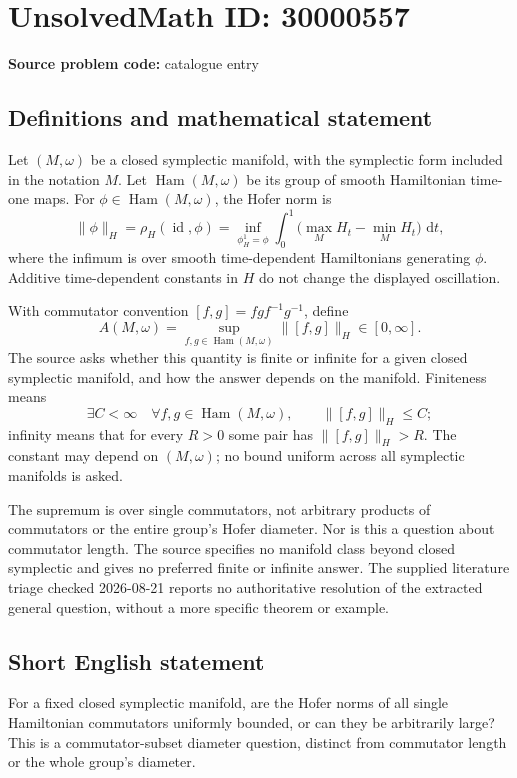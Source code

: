 \documentclass[11pt]{article}
\newcommand{\dd}{\,\mathrm{d}}
\begin{document}
\section*{UnsolvedMath ID: 30000557}
\textbf{Source problem code:} catalogue entry
\subsection{Definitions and mathematical statement}
Let \((M,\omega)\) be a closed symplectic manifold, with the symplectic form included in the notation \(M\). Let \(\operatorname{Ham}(M,\omega)\) be its group of smooth Hamiltonian time-one maps. For \(\phi\in\operatorname{Ham}(M,\omega)\), the Hofer norm is
\[
\|\phi\|_H=\rho_H(\operatorname{id},\phi)
=\inf_{\phi_H^1=\phi}\int_0^1
\bigl(\max_M H_t-\min_M H_t\bigr)\,\dd t,
\]
where the infimum is over smooth time-dependent Hamiltonians generating \(\phi\). Additive time-dependent constants in \(H\) do not change the displayed oscillation.

With commutator convention \([f,g]=fgf^{-1}g^{-1}\), define
\[
A(M,\omega)=\sup_{f,g\in\operatorname{Ham}(M,\omega)}\|[f,g]\|_H\in[0,\infty].
\]
The source asks whether this quantity is finite or infinite for a given closed symplectic manifold, and how the answer depends on the manifold. Finiteness means
\[
\exists C<\infty\quad\forall f,g\in\operatorname{Ham}(M,\omega),\qquad
\|[f,g]\|_H\leq C;
\]
infinity means that for every \(R>0\) some pair has \(\|[f,g]\|_H>R\). The constant may depend on \((M,\omega)\); no bound uniform across all symplectic manifolds is asked.

The supremum is over single commutators, not arbitrary products of commutators or the entire group's Hofer diameter. Nor is this a question about commutator length. The source specifies no manifold class beyond closed symplectic and gives no preferred finite or infinite answer. The supplied literature triage checked 2026-08-21 reports no authoritative resolution of the extracted general question, without a more specific theorem or example.
\subsection{Short English statement}
For a fixed closed symplectic manifold, are the Hofer norms of all single Hamiltonian commutators uniformly bounded, or can they be arbitrarily large? This is a commutator-subset diameter question, distinct from commutator length or the whole group's diameter.
\end{document}
